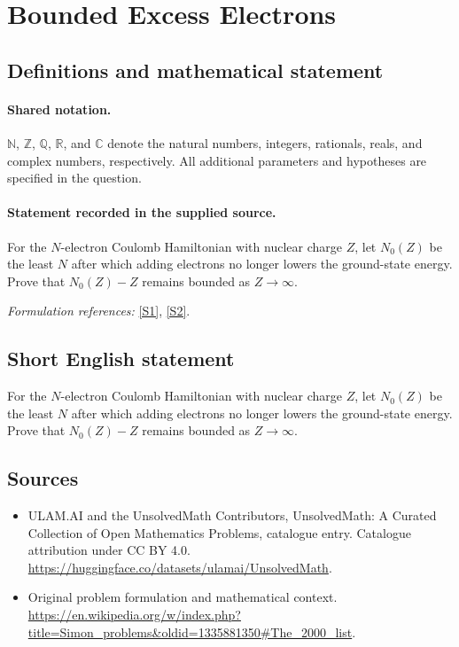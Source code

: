 \documentclass[11pt]{article}
\newcommand{\sref}[2]{\hyperlink{source:#1:#2}{[S#2]}}
\begin{document}
\section{Bounded Excess Electrons}\label{statement}

\subsection{Definitions and mathematical statement}

\paragraph{Shared notation.}$\mathbb N$, $\mathbb Z$, $\mathbb Q$, $\mathbb R$, and $\mathbb C$ denote the natural numbers, integers, rationals, reals, and complex numbers, respectively. All additional parameters and hypotheses are specified in the question.


\paragraph{Statement recorded in the supplied source.}
For the $N$-electron Coulomb Hamiltonian with nuclear charge $Z$, let $N_0(Z)$ be the least $N$ after which adding electrons no longer lowers the ground-state energy. Prove that $N_0(Z)-Z$ remains bounded as $Z\to\infty$.
\par\smallskip\textit{Formulation references:} \sref{statement}{1}, \sref{statement}{2}.
\subsection{Short English statement}
For the $N$-electron Coulomb Hamiltonian with nuclear charge $Z$, let $N_0(Z)$ be the least $N$ after which adding electrons no longer lowers the ground-state energy. Prove that $N_0(Z)-Z$ remains bounded as $Z\to\infty$.
\subsection{Sources}
\begin{itemize}
\item[\hypertarget{source:statement:1}{S1}] ULAM.AI and the UnsolvedMath Contributors, UnsolvedMath: A Curated Collection of Open Mathematics Problems, catalogue entry. Catalogue attribution under CC BY 4.0.
\url{https://huggingface.co/datasets/ulamai/UnsolvedMath}.
\item[\hypertarget{source:statement:2}{S2}] Original problem formulation and mathematical context.
\url{https://en.wikipedia.org/w/index.php?title=Simon_problems&oldid=1335881350#The_2000_list}.
\end{itemize}
\label{end:statement}
\end{document}

